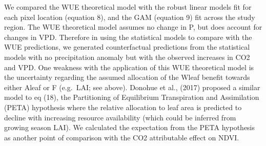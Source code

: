\documentclass[gc, manuscript]{copernicus}
\begin{document}
We compared the WUE theoretical model with the robust linear models fit
for each pixel location (equation 8), and the GAM (equation 9) fit
across the study region. The WUE theoretical model assumes no change in
P, but does account for changes in VPD. Therefore in using the
statistical models to compare with the WUE predictions, we generated
counterfactual predictions from the statistical models with no
precipitation anomaly but with the observed increases in CO2 and VPD.
One weakness with the application of this WUE theoretical model is the
uncertainty regarding the assumed allocation of the Wleaf benefit
towards either Aleaf or F (e.g.~LAI; see above). Donohue et al., (2017)
proposed a similar model to eq (18), the Partitioning of Equilibrium
Transpiration and Assimilation (PETA) hypothesis where the relative
allocation to leaf area is predicted to decline with increasing resource
availability (which could be inferred from growing season LAI). We
calculated the expectation from the PETA hypothesis as another point of
comparison with the CO2 attributable effect on NDVI.
\end{document}
